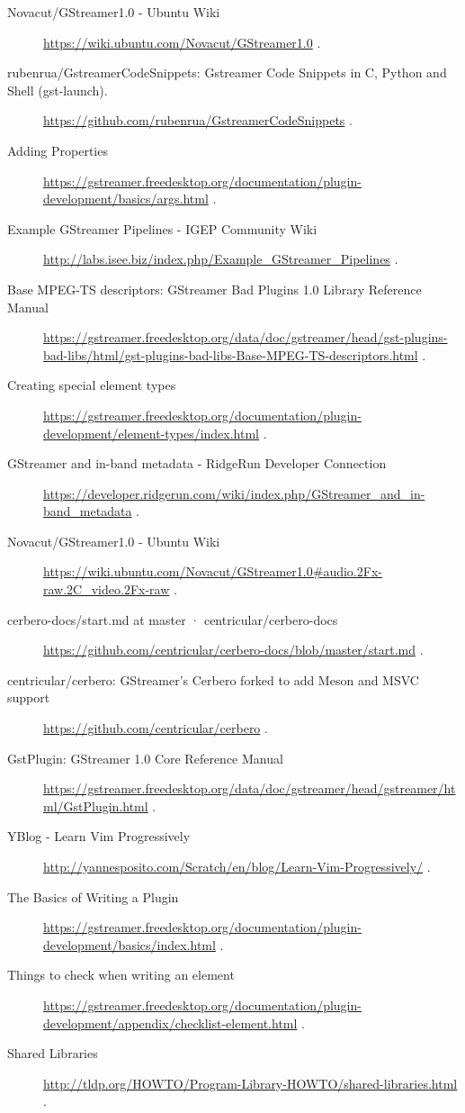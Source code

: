 \begin{description}
\item [Novacut/GStreamer1.0 - Ubuntu Wiki] \url{https://wiki.ubuntu.com/Novacut/GStreamer1.0} . 
\item [rubenrua/GstreamerCodeSnippets: Gstreamer Code Snippets in C, Python and Shell (gst-launch).] \url{https://github.com/rubenrua/GstreamerCodeSnippets} . 
\item [Adding Properties] \url{https://gstreamer.freedesktop.org/documentation/plugin-development/basics/args.html} . 
\item [Example GStreamer Pipelines - IGEP Community Wiki] \url{http://labs.isee.biz/index.php/Example_GStreamer_Pipelines} . 
\item [Base MPEG-TS descriptors: GStreamer Bad Plugins 1.0 Library Reference Manual] \url{https://gstreamer.freedesktop.org/data/doc/gstreamer/head/gst-plugins-bad-libs/html/gst-plugins-bad-libs-Base-MPEG-TS-descriptors.html} . 
\item [Creating special element types] \url{https://gstreamer.freedesktop.org/documentation/plugin-development/element-types/index.html} . 
\item [GStreamer and in-band metadata - RidgeRun Developer Connection] \url{https://developer.ridgerun.com/wiki/index.php/GStreamer_and_in-band_metadata} . 
\item [Novacut/GStreamer1.0 - Ubuntu Wiki] \url{https://wiki.ubuntu.com/Novacut/GStreamer1.0#audio.2Fx-raw.2C_video.2Fx-raw} . 
\item [cerbero-docs/start.md at master · centricular/cerbero-docs] \url{https://github.com/centricular/cerbero-docs/blob/master/start.md} . 
\item [centricular/cerbero: GStreamer's Cerbero forked to add Meson and MSVC support] \url{https://github.com/centricular/cerbero} . 
\item [GstPlugin: GStreamer 1.0 Core Reference Manual] \url{https://gstreamer.freedesktop.org/data/doc/gstreamer/head/gstreamer/html/GstPlugin.html} . 
\item [YBlog - Learn Vim Progressively] \url{http://yannesposito.com/Scratch/en/blog/Learn-Vim-Progressively/} . 
\item [The Basics of Writing a Plugin] \url{https://gstreamer.freedesktop.org/documentation/plugin-development/basics/index.html} . 
\item [Things to check when writing an element] \url{https://gstreamer.freedesktop.org/documentation/plugin-development/appendix/checklist-element.html} . 
\item [Shared Libraries] \url{http://tldp.org/HOWTO/Program-Library-HOWTO/shared-libraries.html} . 

\end{description}
